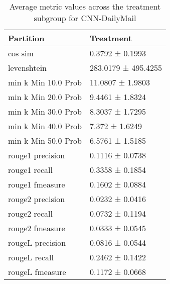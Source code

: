 \begin{table}
\caption{Average metric values across the treatment subgroup for CNN-DailyMail}
\label{tab:}
\begin{tabular}{ll}
\toprule
Partition & Treatment \\
\midrule
cos sim & 0.3792 ± 0.1993 \\
levenshtein & 283.0179 ± 495.4255 \\
min k Min 10.0 Prob & 11.0807 ± 1.9803 \\
min k Min 20.0 Prob & 9.4461 ± 1.8324 \\
min k Min 30.0 Prob & 8.3037 ± 1.7295 \\
min k Min 40.0 Prob & 7.372 ± 1.6249 \\
min k Min 50.0 Prob & 6.5761 ± 1.5185 \\
rouge1 precision & 0.1116 ± 0.0738 \\
rouge1 recall & 0.3358 ± 0.1854 \\
rouge1 fmeasure & 0.1602 ± 0.0884 \\
rouge2 precision & 0.0232 ± 0.0416 \\
rouge2 recall & 0.0732 ± 0.1194 \\
rouge2 fmeasure & 0.0333 ± 0.0545 \\
rougeL precision & 0.0816 ± 0.0544 \\
rougeL recall & 0.2462 ± 0.1422 \\
rougeL fmeasure & 0.1172 ± 0.0668 \\
\bottomrule
\end{tabular}
\end{table}
